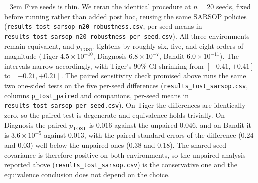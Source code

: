 {\emergencystretch=3em Five seeds is thin. We reran the identical procedure at $n{=}20$ seeds, fixed before running rather than added post hoc, reusing the same SARSOP policies (\texttt{results\_\allowbreak tost\_\allowbreak sarsop\_\allowbreak n20\_\allowbreak robustness.csv}, per-seed means in \texttt{results\_\allowbreak tost\_\allowbreak sarsop\_\allowbreak n20\_\allowbreak robustness\_\allowbreak per\_\allowbreak seed.csv}). All three environments remain equivalent, and $p_{\mathrm{TOST}}$ tightens by roughly six, five, and eight orders of magnitude (Tiger $4.5{\times}10^{-10}$, Diagnosis $6.8{\times}10^{-7}$, Bandit $6.0{\times}10^{-11}$). The intervals narrow accordingly, with Tiger's $90\%$ CI shrinking from $[-0.41,+0.41]$ to $[-0.21,+0.21]$. The paired sensitivity check promised above runs the same two one-sided tests on the five per-seed differences (\texttt{results\_\allowbreak tost\_\allowbreak sarsop.csv}, columns \texttt{p\_\allowbreak tost\_\allowbreak paired} and companions, per-seed means in \texttt{results\_\allowbreak tost\_\allowbreak sarsop\_\allowbreak per\_\allowbreak seed.csv}). On Tiger the differences are identically zero, so the paired test is degenerate and equivalence holds trivially. On Diagnosis the paired $p_{\mathrm{TOST}}$ is $0.016$ against the unpaired $0.046$, and on Bandit it is $3.6{\times}10^{-5}$ against $0.013$, with the paired standard errors of the difference ($0.24$ and $0.03$) well below the unpaired ones ($0.38$ and $0.18$). The shared-seed covariance is therefore positive on both environments, so the unpaired analysis reported above (\texttt{results\_\allowbreak tost\_\allowbreak sarsop.csv}) is the conservative one and the equivalence conclusion does not depend on the choice.\par}

